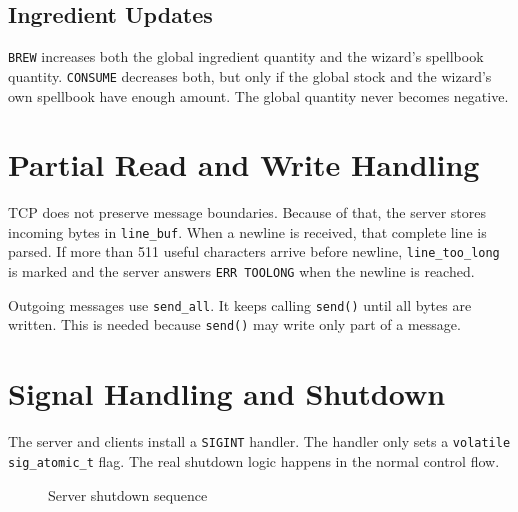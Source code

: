 \documentclass[11pt,a4paper]{article}
\begin{document}
\subsection{Ingredient Updates}

\texttt{BREW} increases both the global ingredient quantity and the wizard's spellbook quantity.
\texttt{CONSUME} decreases both, but only if the global stock and the wizard's own spellbook have
enough amount. The global quantity never becomes negative.

\section{Partial Read and Write Handling}

TCP does not preserve message boundaries. Because of that, the server stores incoming bytes in
\texttt{line\_buf}. When a newline is received, that complete line is parsed. If more than 511 useful
characters arrive before newline, \texttt{line\_too\_long} is marked and the server answers
\texttt{ERR TOOLONG} when the newline is reached.

Outgoing messages use \texttt{send\_all}. It keeps calling \texttt{send()} until all bytes are written.
This is needed because \texttt{send()} may write only part of a message.

\section{Signal Handling and Shutdown}

The server and clients install a \texttt{SIGINT} handler. The handler only sets a
\texttt{volatile sig\_atomic\_t} flag. The real shutdown logic happens in the normal control flow.

\begin{figure}[H]
\centering
{}
\caption{Server shutdown sequence}
\end{figure}
\end{document}
